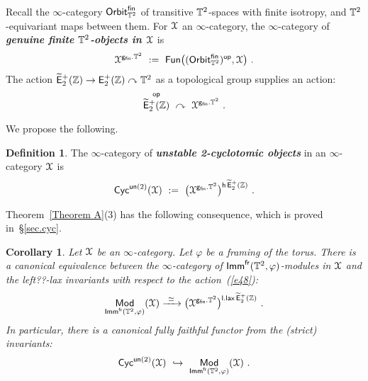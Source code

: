 \documentclass{amsart}
\newtheorem{cor}[theorem]{Corollary}
\theoremstyle{definition}
\newtheorem{definition}[theorem]{Definition}
\theoremstyle{remark}
\DeclareMathOperator{\Mod}{\sf Mod}
\DeclareMathOperator{\Fun}{{\sf Fun}}
\newcommand{\bit}[1]{\textbf{\textit{#1}}}
\newcommand{\lacts}{\curvearrowright}
\DeclareMathOperator{\op}{\mathsf{op}}
\DeclareMathOperator{\fr}{\sf fr}
\newcommand{\w}{\widetilde}
\newcommand{\un}{\underline}
\newcommand{\xra}{\xrightarrow}
\def\sE{\mathsf E}\def\sF{\mathsf F}\def\sG{\mathsf G}\def\sH{\mathsf H}
\DeclareMathOperator{\Ebraid}{\w{\sf E}_{2}^{+}(\ZZ)}
\DeclareMathOperator{\Imm}{\sf Imm}
\DeclareMathOperator{\EpZ}{\sE^+_2(\ZZ)}
\begin{document}
{\color{magenta}
Recall the $\infty$-category ${\sf Orbit}_{\mathbb T^2}^{\sf fin}$ of transitive $\mathbb T^2$-spaces with finite isotropy, and $\mathbb T^2$-equivariant maps between them. 
For $\mathcal X$ an $\infty$-category, the $\infty$-category of \bit{genuine finite $\mathbb T^2$-objects in $\mathcal X$} is
\[
\cX^{{\sf g}_{\sf fin}. \TT^2}
~:=~
\Fun\bigl(
({\sf Orbit}^{\sf fin}_{\TT^2})^{\op} , \cX
\bigr)
~.
\]
The action $\Ebraid \to \EpZ \lacts \TT^2$ as a topological group supplies an action:
\begin{equation}
\label{e48}
\Ebraid^{\op}~ \lacts~ \cX^{{\sf g}_{\sf fin}. \TT^2}
~.
\end{equation}


We propose the following.
\begin{definition}
\label{d2}
The $\infty$-category of \bit{unstable 2-cyclotomic objects} in an $\infty$-category $\mathcal X$ is
\[
{\sf Cyc}^{{\sf un} (2)}(\cX)
~:=~
\bigl( \cX^{{\sf g}_{\sf fin}. \TT^2}\bigr)^{{\sf h}\Ebraid}
~.
\]


\end{definition}











Theorem~\ref{Theorem A}(3) has the following consequence, which is proved in~\S\ref{sec.cyc}.
\begin{cor}
\label{t30}
Let $\mathcal X$ be an $\infty$-category.
Let $\varphi$ be a framing of the torus.
There is a canonical equivalence between the $\infty$-category of $\Imm^{\fr}(\TT^2,\varphi)$-modules in $\mathcal X$ and the left??-lax invariants with respect to the action~(\ref{e48}):
\[
\Mod_{\Imm^{\fr}(\TT^2 , \varphi)} ( \cX )
\xra{~\simeq~}
\bigl( \cX^{{\sf g}_{\sf fin}. \TT^2}\bigr)^{{\sf l.lax} \Ebraid}
~.
\]
In particular, there is a canonical fully faithful functor from the (strict) invariants:
\[
{\sf Cyc}^{{\sf un} (2)}(\cX)
~\hookrightarrow~
\Mod_{\Imm^{\fr}(\TT^2 , \varphi)} ( \cX )
~.
\]



\end{cor}}
\end{document}

